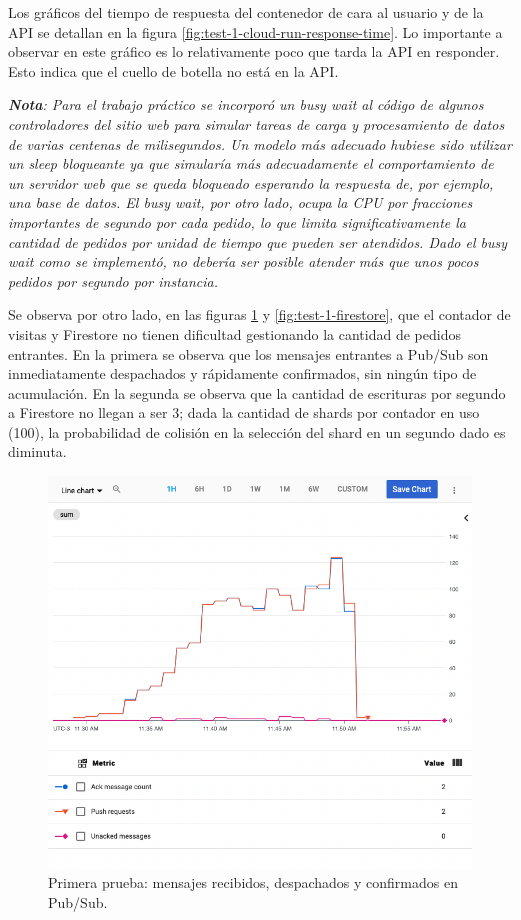 \documentclass[11pt]{scrartcl}
\begin{document}
Los gráficos del tiempo de respuesta del contenedor de cara al usuario y de la API se detallan en la figura \ref{fig:test-1-cloud-run-response-time}. Lo importante a observar en este gráfico es lo relativamente poco que tarda la API en responder. Esto indica que el cuello de botella no está en la API.

\textit{\textbf{Nota}: Para el trabajo práctico se incorporó un busy wait al código de algunos controladores del sitio web para simular tareas de carga y procesamiento de datos de varias centenas de milisegundos. Un modelo más adecuado hubiese sido utilizar un sleep bloqueante ya que simularía más adecuadamente el comportamiento de un servidor web que se queda bloqueado esperando la respuesta de, por ejemplo, una base de datos. El busy wait, por otro lado, ocupa la CPU por fracciones importantes de segundo por cada pedido, lo que limita significativamente la cantidad de pedidos por unidad de tiempo que pueden ser atendidos. Dado el busy wait como se implementó, no debería ser posible atender más que unos pocos pedidos por segundo por instancia.}

Se observa por otro lado, en las figuras \ref{fig:test-1-pubsub-subscription} y \ref{fig:test-1-firestore}, que el contador de visitas y Firestore no tienen dificultad  gestionando la cantidad de pedidos entrantes. En la primera se observa que los mensajes entrantes a Pub/Sub son inmediatamente despachados y rápidamente confirmados, sin ningún tipo de acumulación. En la segunda se observa que la cantidad de escrituras por segundo a Firestore no llegan a ser 3; dada la cantidad de shards por contador en uso (100), la probabilidad de colisión en la selección del shard en un segundo dado es diminuta.

\begin{figure}
\centering
\includegraphics[scale=0.4]{img/pubsub-subscription}
\caption{Primera prueba: mensajes recibidos, despachados y confirmados en Pub/Sub.}
\label{fig:test-1-pubsub-subscription}
\end{figure}
\end{document}
